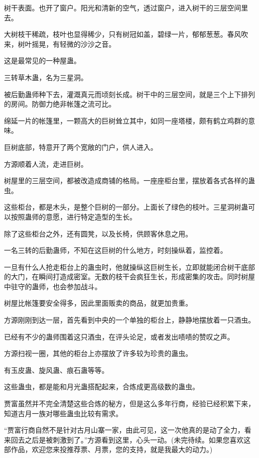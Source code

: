 \begin{this_body}
树干表面。也开了窗户。阳光和清新的空气，透过窗户，进入树干的三层空间里去。

大树枝干稀疏，枝叶也显得稀少，只有树冠如盖，碧绿一片，郁郁葱葱。春风吹来，树叶摇晃，有轻微的沙沙之音。

这是最常见的一种屋蛊。

三转草木蛊，名为三星洞。

被后勤蛊师种下去，灌溉真元而顷刻长成。树干中的三层空间，就是三个上下排列的房间。防御力绝非帐篷之流可比。

绵延一片的帐篷里，一颗高大的巨树耸立其中，如同一座塔楼，颇有鹤立鸡群的意味。

巨树底部，特意开了两个宽敞的门户，供人进入。

方源顺着人流，走进巨树。

树屋里的三层空间，都被改造成商铺的格局。一座座柜台里，摆放着各式各样的蛊虫。

这些柜台，都是木头，是整个巨树的一部分。上面长了绿色的枝叶。三星洞树蛊可以按照蛊师的意愿，进行特定造型的生长。

除了这些柜台之外，还有圆凳，以及长椅，供顾客休息之用。

一名三转的后勤蛊师，不知在这巨树的什么地方，时刻操纵着，监控着。

一旦有什么人抢走柜台上的蛊虫时，他就操纵这巨树生长，立即就能闭合树干底部的大门，在瞬间打造成密室。无数的枝干会疯狂生长，形成密集的攻击。同时树屋中驻守的蛊师，也会参加战斗。

树屋比帐篷要安全得多，因此里面贩卖的商品，就更加贵重。

方源刚刚到达一层，首先看到中央的一个单独的柜台上，静静地摆放着一只酒虫。

已经有不少的蛊师围着这只酒虫，在评头论足，或者发出啧啧的赞叹之声。

方源扫视一圈，其他的柜台上亦摆放了许多较为珍贵的蛊虫。

有玉皮蛊、旋风蛊、痕石蛊等等。

这些蛊虫，都是能和月光蛊搭配起来，合炼成更高级数的蛊虫。

贾富虽然并不完全清楚这些合炼的秘方，但是这么多年行商，经验已经积累下来，知道古月一族对哪些蛊虫比较有需求。

“贾富行商自然不是针对古月山寨一家，由此可见，这一次他真的是动了全力，看来回去之后是被刺激到了。”方源看到这里，心头一动。(未完待续。如果您喜欢这部作品，欢迎您来投推荐票、月票，您的支持，就是我最大的动力。)

\end{this_body}

